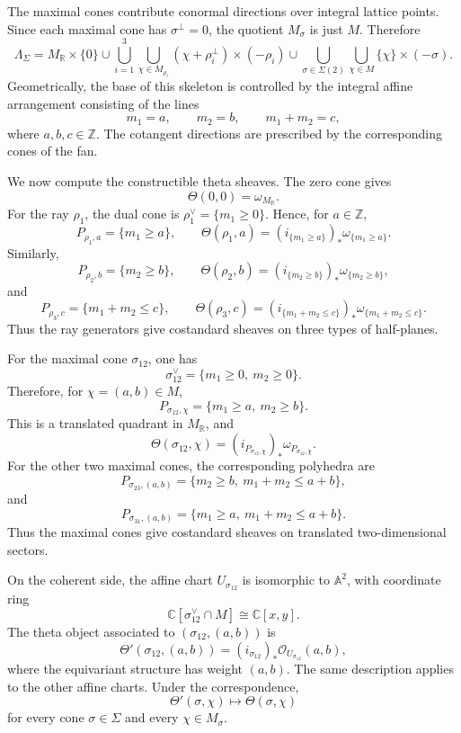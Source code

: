 The maximal cones contribute conormal directions over integral lattice points. Since each maximal cone has \(\sigma^\perp=0\), the quotient \(M_\sigma\) is just \(M\). Therefore
\[
\Lambda_\Sigma
=
M_{\mathbb R}\times\{0\}
\cup
\bigcup_{i=1}^3
\bigcup_{\chi\in M_{\rho_i}}
(\chi+\rho_i^\perp)\times(-\rho_i)
\cup
\bigcup_{\sigma\in\Sigma(2)}
\bigcup_{\chi\in M}
\{\chi\}\times(-\sigma).
\]
Geometrically, the base of this skeleton is controlled by the integral affine arrangement consisting of the lines
\[
m_1=a,\qquad m_2=b,\qquad m_1+m_2=c,
\]
where \(a,b,c\in\mathbb Z\). The cotangent directions are prescribed by the corresponding cones of the fan.

We now compute the constructible theta sheaves. The zero cone gives
\[
\Theta(0,0)=\omega_{M_{\mathbb R}}.
\]
For the ray \(\rho_1\), the dual cone is \(\rho_1^\vee=\{m_1\ge 0\}\). Hence, for \(a\in\mathbb Z\),
\[
P_{\rho_1,a}=\{m_1\ge a\},
\qquad
\Theta(\rho_1,a)=(i_{\{m_1\ge a\}})_*\omega_{\{m_1\ge a\}}.
\]
Similarly,
\[
P_{\rho_2,b}=\{m_2\ge b\},
\qquad
\Theta(\rho_2,b)=(i_{\{m_2\ge b\}})_*\omega_{\{m_2\ge b\}},
\]
and
\[
P_{\rho_3,c}=\{m_1+m_2\le c\},
\qquad
\Theta(\rho_3,c)=(i_{\{m_1+m_2\le c\}})_*\omega_{\{m_1+m_2\le c\}}.
\]
Thus the ray generators give costandard sheaves on three types of half-planes.

For the maximal cone \(\sigma_{12}\), one has
\[
\sigma_{12}^\vee=\{m_1\ge 0,\ m_2\ge 0\}.
\]
Therefore, for \(\chi=(a,b)\in M\),
\[
P_{\sigma_{12},\chi}
=
\{m_1\ge a,\ m_2\ge b\}.
\]
This is a translated quadrant in \(M_{\mathbb R}\), and
\[
\Theta(\sigma_{12},\chi)
=
(i_{P_{\sigma_{12},\chi}})_*\omega_{P_{\sigma_{12},\chi}}.
\]
For the other two maximal cones, the corresponding polyhedra are
\[
P_{\sigma_{23},(a,b)}
=
\{m_2\ge b,\ m_1+m_2\le a+b\},
\]
and
\[
P_{\sigma_{31},(a,b)}
=
\{m_1\ge a,\ m_1+m_2\le a+b\}.
\]
Thus the maximal cones give costandard sheaves on translated two-dimensional sectors.

On the coherent side, the affine chart \(U_{\sigma_{12}}\) is isomorphic to \(\mathbb A^2\), with coordinate ring
\[
\mathbb C[\sigma_{12}^\vee\cap M]\cong \mathbb C[x,y].
\]
The theta object associated to \((\sigma_{12},(a,b))\) is
\[
\Theta'(\sigma_{12},(a,b))
=
(i_{\sigma_{12}})_*\mathcal O_{U_{\sigma_{12}}}(a,b),
\]
where the equivariant structure has weight \((a,b)\). The same description applies to the other affine charts. Under the correspondence,
\[
\Theta'(\sigma,\chi)\longmapsto \Theta(\sigma,\chi)
\]
for every cone \(\sigma\in\Sigma\) and every \(\chi\in M_\sigma\).

